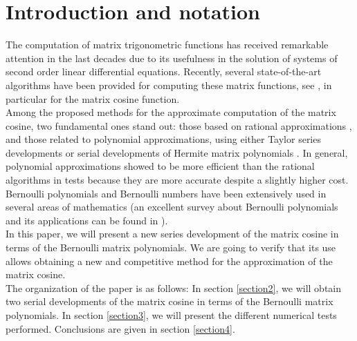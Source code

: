 \section{Introduction and notation}

The computation of matrix trigonometric functions has received remarkable
attention in the last decades due to its usefulness in the solution of systems of
second order linear differential equations. Recently, several state-of-the-art
algorithms have been provided for computing these matrix functions, see \cite{Serb80, dehghan2010computing, High08, alonso2018computing}, in
particular for the matrix cosine function.\\



Among the proposed methods for the approximate computation of the matrix cosine, two fundamental ones stand out: those based on rational approximations \cite{tsitouras2014bounds, Serb79, Serb80, AlHR15}, and those related to  polynomial approximations, using either Taylor series developments  \cite{sastre2017two, sastre2019fast} or serial developments of Hermite matrix polynomials  \cite{defez2019efficient}. In general, polynomial approximations showed to be more efficient than the rational algorithms in tests because they are more accurate despite a slightly higher cost.\\


Bernoulli polynomials and Bernoulli numbers have been extensively used in several areas of mathematics (an excellent survey about Bernoulli polynomials and its applications can be found in  \cite{kouba2013lecture}).\\


In this paper, we will present a new series development of the matrix cosine in terms of the Bernoulli matrix polynomials. We are going to verify that its use allows obtaining a new and competitive method for the approximation of the matrix cosine. \\



The organization of the paper is as follows: In section \ref{section2}, we will obtain two serial developments of the matrix cosine in terms of the Bernoulli matrix polynomials. In section \ref{section3}, we will present the different numerical tests performed. Conclusions are given in section \ref{section4}.\\


